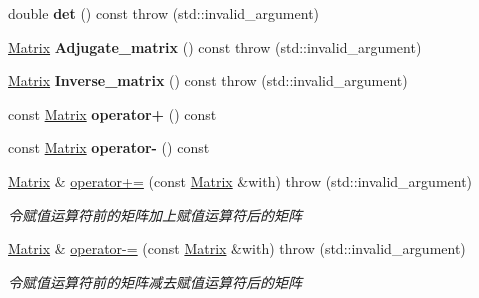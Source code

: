 \begin{DoxyCompactItemize}
\item 
\mbox{\label{classkerbal_1_1math_1_1_matrix_a7289f2b36f95af690b62f11131854cf3}} 
double {\bfseries det} () const  throw (std\+::invalid\+\_\+argument)
\item 
\mbox{\label{classkerbal_1_1math_1_1_matrix_af05f82ae450547615242aa9249f48eb8}} 
\hyperlink{classkerbal_1_1math_1_1_matrix}{Matrix} {\bfseries Adjugate\+\_\+matrix} () const  throw (std\+::invalid\+\_\+argument)
\item 
\mbox{\label{classkerbal_1_1math_1_1_matrix_a261f7c5a383008954f0b806f8b25b152}} 
\hyperlink{classkerbal_1_1math_1_1_matrix}{Matrix} {\bfseries Inverse\+\_\+matrix} () const  throw (std\+::invalid\+\_\+argument)
\item 
\mbox{\label{classkerbal_1_1math_1_1_matrix_aa074455d62b7f76562b58626997e70df}} 
const \hyperlink{classkerbal_1_1math_1_1_matrix}{Matrix} {\bfseries operator+} () const
\item 
\mbox{\label{classkerbal_1_1math_1_1_matrix_a0b2c1bd12d1064bebc2fa195f5c680d2}} 
const \hyperlink{classkerbal_1_1math_1_1_matrix}{Matrix} {\bfseries operator-\/} () const
\item 
\hyperlink{classkerbal_1_1math_1_1_matrix}{Matrix} \& \hyperlink{classkerbal_1_1math_1_1_matrix_a2adadd6868dbd09192a77655dc54a580}{operator+=} (const \hyperlink{classkerbal_1_1math_1_1_matrix}{Matrix} \&with)  throw (std\+::invalid\+\_\+argument)
\begin{DoxyCompactList}\small\item\em 令赋值运算符前的矩阵加上赋值运算符后的矩阵 \end{DoxyCompactList}\item 
\hyperlink{classkerbal_1_1math_1_1_matrix}{Matrix} \& \hyperlink{classkerbal_1_1math_1_1_matrix_a4fcc469526f1c13aab912278ba69dd85}{operator-\/=} (const \hyperlink{classkerbal_1_1math_1_1_matrix}{Matrix} \&with)  throw (std\+::invalid\+\_\+argument)
\begin{DoxyCompactList}\small\item\em 令赋值运算符前的矩阵减去赋值运算符后的矩阵 \end{DoxyCompactList}\item 

\end{DoxyCompactItemize}

